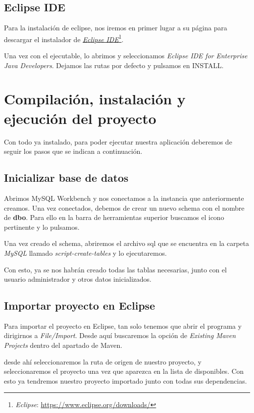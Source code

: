 \subsection{Eclipse IDE}

Para la instalación de eclipse, nos iremos en primer lugar a su página para descargar el instalador de \href{https://www.eclipse.org/downloads/}{\textit{Eclipse IDE}}\footnote{\textit{Eclipse}: \url{https://www.eclipse.org/downloads/}}.

Una vez con el ejecutable, lo abrimos y seleccionamos \textit{Eclipse IDE for Enterprise Java Developers}. Dejamos las rutas por defecto y pulsamos en INSTALL. 

\section{Compilación, instalación y ejecución del proyecto}

Con todo ya instalado, para poder ejecutar nuestra aplicación deberemos de seguir los pasos que se indican a continuación.

\subsection{Inicializar base de datos}

Abrimos MySQL Workbench y nos conectamos a la instancia que anteriormente creamos. Una vez conectados, debemos de crear un nuevo schema con el nombre de \textbf{dbo}. Para ello en la barra de herramientas superior buscamos el icono pertinente y lo pulsamos.

Una vez creado el schema, abriremos el archivo sql que se encuentra en la carpeta \textit{MySQL} llamado \textit{script-create-tables} y lo ejecutaremos. 

Con esto, ya se nos habrán creado todas las tablas necesarias, junto con el usuario administrador y otros datos inicializados.

\subsection{Importar proyecto en Eclipse}

Para importar el proyecto en Eclipse, tan solo tenemos que abrir el programa y dirigirnos a \textit{File/Import}. Desde aquí buscaremos la opción de \textit{Existing Maven Projects} dentro del apartado de Maven.

desde ahí seleccionaremos la ruta de origen de nuestro proyecto, y seleccionaremos el proyecto una vez que aparezca en la lista de disponibles. Con esto ya tendremos nuestro proyecto importado junto con todas sus dependencias.

